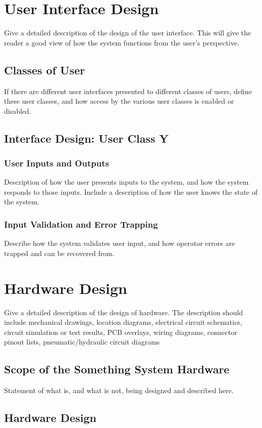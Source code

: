 \documentclass[11pt,a4paper]{article}
\begin{document}
\section{User Interface Design}
Give a detailed description of the design of the user interface. This will give the reader a good view of how the system functions from the user’s perspective.
\subsection{Classes of User}
If there are different user interfaces presented to different classes of users, define these user classes, and how access by the various user classes is enabled or disabled.
\subsection{Interface Design: User Class Y}
\subsubsection{User Inputs and Outputs}
Description of how the user presents inputs to the system, and how the system responds to those inputs. Include a description of how the user knows the state of the system.
\subsubsection{Input Validation and Error Trapping}
Describe how the system validates user input, and how operator errors are trapped and can be recovered from.

\section{Hardware Design}
Give a detailed description of the design of hardware. The description should include mechanical drawings, location diagrams, electrical circuit schematics, circuit simulation or test results, PCB overlays, wiring diagrams, connector pinout lists, pneumatic/hydraulic circuit diagrams

\subsection{Scope of the Something System Hardware}
Statement of what is, and what is not, being designed and described here.
\subsection{Hardware Design}
\end{document}
